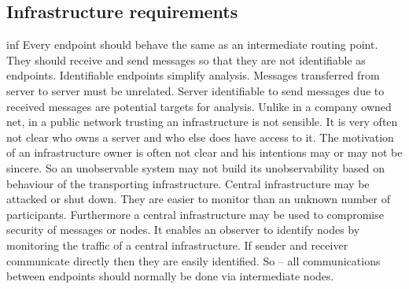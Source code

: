 \documentclass[12pt,journal,compsoc,peerreview]{IEEEtran}
\begin{document}
\subsection{Infrastructure requirements}
\begin{entity}{inf}
		Every endpoint should behave the same as an intermediate routing point. They should receive and send messages so that they are not identifiable as endpoints. Identifiable endpoints simplify analysis.
		Messages transferred from server to server must be unrelated. Server identifiable to send messages due to received messages are potential targets for analysis.
		Unlike in a company owned net, in a public network trusting an infrastructure is not sensible. It is very often not clear who owns a server and who else does have access to it. The motivation of an infrastructure owner is often not clear and his intentions may or may not be sincere. So an unobservable system may not build its unobservability based on behaviour of the transporting infrastructure.
		Central infrastructure may be attacked or shut down. They are easier to monitor than an unknown number of participants. Furthermore a central infrastructure may be used to compromise security of messages or nodes. It enables an observer to identify nodes by monitoring the traffic of a central infrastructure.
		If sender and receiver communicate directly then they are easily identified. So -- all communications between endpoints should normally be done via intermediate nodes.
\end{entity} 

%
%
\end{document}
